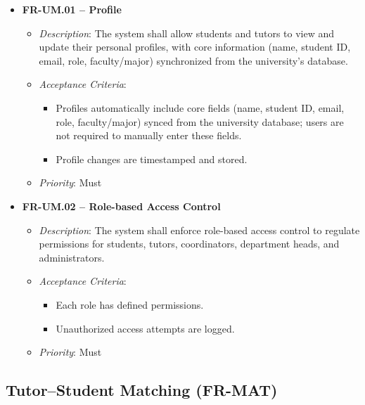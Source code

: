 \begin{itemize}
    \item \textbf{FR-UM.01 – Profile}
        \begin{itemize}
            \item \textit{Description}: The system shall allow students and tutors to view and update their personal profiles, with core information (name, student ID, email, role, faculty/major) synchronized from the university’s database.
            \item \textit{Acceptance Criteria}:
                \begin{itemize}
                    \item Profiles automatically include core fields (name, student ID, email, role, faculty/major) synced from the university database; users are not required to manually enter these fields.
                    \item Profile changes are timestamped and stored.
                \end{itemize}
            \item \textit{Priority}: Must
        \end{itemize}
    \item \textbf{FR-UM.02 – Role-based Access Control}
        \begin{itemize}
                    \item \textit{Description}: The system shall enforce role-based access control to regulate permissions for students, tutors, coordinators, department heads, and administrators.
                    \item \textit{Acceptance Criteria}:
                        \begin{itemize}
                            \item Each role has defined permissions.
                            \item Unauthorized access attempts are logged.
                        \end{itemize} 
                    \item \textit{Priority}: Must
                \end{itemize}
        \end{itemize}

\subsection{Tutor--Student Matching (FR-MAT)}

